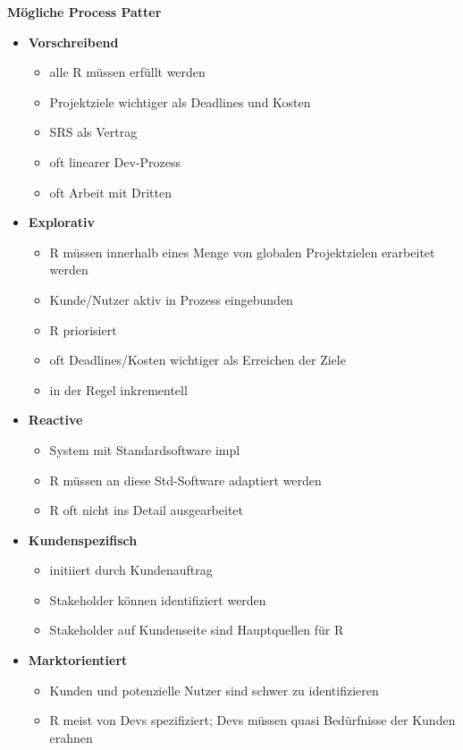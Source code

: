 \textbf{Mögliche Process Patter}
\begin{itemize}
	\item \textbf{Vorschreibend}
	\begin{itemize}
		\item alle R müssen erfüllt werden
		\item Projektziele wichtiger als Deadlines und Kosten
		\item SRS als Vertrag 
		\item oft linearer Dev-Prozess
		\item oft Arbeit mit Dritten
	\end{itemize}
	
	\item \textbf{Explorativ}
	\begin{itemize}
		\item R müssen innerhalb eines Menge von globalen Projektzielen erarbeitet werden
		\item Kunde/Nutzer aktiv in Prozess eingebunden
		\item R priorisiert
		\item oft Deadlines/Kosten wichtiger als Erreichen der Ziele
		\item in der Regel inkrementell
	\end{itemize}
	
	\item \textbf{Reactive}
	\begin{itemize}
		\item System mit Standardsoftware impl
		\item R müssen an diese Std-Software adaptiert werden
		\item R oft nicht ins Detail ausgearbeitet
	\end{itemize}
	
	
	\item \textbf{Kundenspezifisch}
	\begin{itemize}
		\item initiiert durch Kundenauftrag
		\item Stakeholder können identifiziert werden
		\item Stakeholder auf Kundenseite sind Hauptquellen für R
	\end{itemize}
	
	\item \textbf{Marktorientiert}
	\begin{itemize}
		\item Kunden und potenzielle Nutzer sind schwer zu identifizieren
		\item R meist von Devs spezifiziert; Devs müssen quasi Bedürfnisse der Kunden erahnen
	\end{itemize}
\end{itemize}

